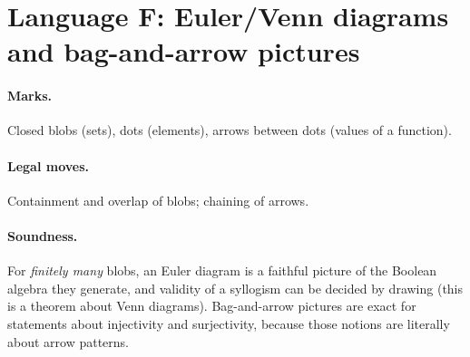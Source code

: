 \section{Language F: Euler/Venn diagrams and bag-and-arrow pictures}
\label{sec:euler}

\paragraph{Marks.} Closed blobs (sets), dots (elements), arrows between dots (values of a
function).
\paragraph{Legal moves.} Containment and overlap of blobs; chaining of arrows.
\paragraph{Soundness.} For \emph{finitely many} blobs, an Euler diagram is a faithful
picture of the Boolean algebra they generate, and validity of a syllogism can be decided
by drawing (this is a theorem about Venn diagrams). Bag-and-arrow pictures are exact for
statements about injectivity and surjectivity, because those notions are literally about
arrow patterns.

